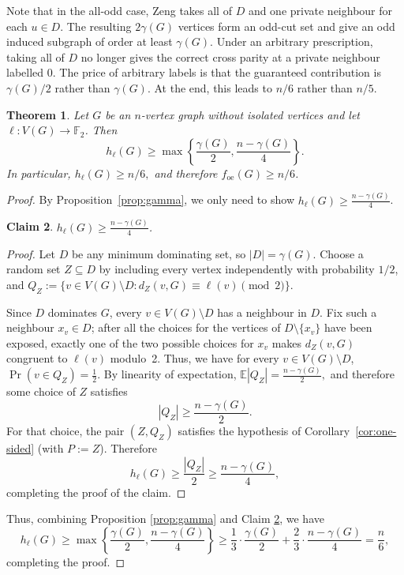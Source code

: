 \documentclass[11pt]{article}
\newcommand{\VV}[1]{{#1}}
\newtheorem{theorem}{Theorem}
\newtheorem{claim}[theorem]{Claim}
\theoremstyle{definition}
\theoremstyle{remark}
\newcommand{\foe}{f_{\mathrm{oe}}}
\newcommand{\F}{\mathbb{F}}
\newcommand{\1}{\mathbf{1}}
\begin{document}
		Note that in the all-odd case, Zeng takes all of $D$ and one private neighbour for each $u\in D$. The resulting $2\gamma(G)$ vertices form an odd-cut set and give an odd induced subgraph of order at least $\gamma(G)$.  Under an arbitrary prescription, taking all of $D$ no longer gives the correct cross parity at a private neighbour labelled $0$. The price of arbitrary labels is that the guaranteed contribution is $\gamma(G)/2$ rather than $\gamma(G)$. At the end, this leads to $n/6$ rather than $n/5.$

	\begin{theorem}\label{thm:pointwise}
		Let $G$ be an $n$-vertex graph without isolated vertices and let
		$\ell:V(G)\to\F_2$.  Then
		\[
		h_\ell(G)\ge
		\max\left\{
		\frac{\gamma(G)}2,
		\frac{n-\gamma(G)}4
		\right\}.
		\]
		In particular,
		\VV{$
		h_\ell(G)\ge n/6,
		$ and therefore $\foe(G)\ge n/6$.}
	\end{theorem}
	\begin{proof}
     By \VV{Proposition}~\ref{prop:gamma}, we only need to show $
	h_\ell(G)\ge \frac{n-\gamma(G)}{4}$. 
		
		\begin{claim}\label{cl:n-gamma/4}
			$h_\ell(G)\ge \frac{n-\gamma(G)}{4}$. 
		\end{claim}
		
		\begin{proof}
					Let $D$ be any minimum dominating set, so $|D|=\gamma(G)$.  Choose a random
			set $Z\subseteq D$ by including every vertex independently with probability
			$1/2$, and $Q_Z:=\bigl\{v\in V(G)\setminus D: d_Z(v,G)\equiv\ell(v)\pmod2\bigr\}.$
			
			Since $D$ dominates $G$, every $v\in V(G)\setminus D$ has a neighbour in $D$. \VV{Fix such a neighbour $x_v\in D$; after all the choices for the vertices of $D\setminus\{x_v\}$ have been exposed, exactly one of the two possible choices for $x_v$ makes $d_Z(v,G)$ congruent to $\ell(v)$ modulo~2.} Thus, we have for every $v\in V(G)\setminus D$, $\Pr(v\in Q_Z)=\frac12$.
			By linearity of expectation,
			$
			\mathbb E|Q_Z|=\frac{n-\gamma(G)}2,
			$
			and therefore some choice of $Z$ satisfies
			\[
			|Q_Z|\ge \frac{n-\gamma(G)}2.
			\]
			For that choice, the pair $(Z,Q_Z)$ satisfies the hypothesis of
			Corollary~\ref{cor:one-sided} (with $P:=Z$).  Therefore
			\[
			h_\ell(G)
			\ge \frac{|Q_Z|}{2}
			\ge \frac{n-\gamma(G)}4,
			\]
		completing the proof of the claim.
		\end{proof}
		
		Thus, combining Proposition \ref{prop:gamma} and Claim \ref{cl:n-gamma/4}, we have
		\[
		h_\ell(G)\ge
		\max\left\{
		\frac{\gamma(G)}2,
		\frac{n-\gamma(G)}4
		\right\}\geq \frac{1}{3}\cdot \frac{\gamma(G)}{2}+\frac{2}{3}\cdot\frac{n-\gamma(G)}{4}=\frac{n}{6},
		\]
		completing the proof.
	\end{proof}
	
\end{document}
